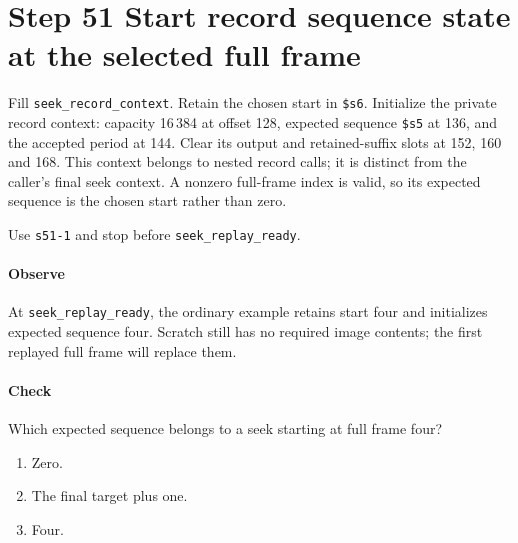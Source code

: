 \section{Step 51 Start record sequence state at the selected full frame}
Fill \texttt{seek\_record\_context}. Retain the chosen start in \texttt{\$s6}. Initialize the private record context: capacity 16\,384 at offset 128, expected sequence \texttt{\$s5} at 136, and the accepted period at 144. Clear its output and retained-suffix slots at 152, 160 and 168. This context belongs to nested record calls; it is distinct from the caller's final seek context. A nonzero full-frame index is valid, so its expected sequence is the chosen start rather than zero.

Use \texttt{s51-1} and stop before \texttt{seek\_replay\_ready}.

\paragraph{Observe} At \texttt{seek\_replay\_ready}, the ordinary example retains start four and initializes expected sequence four. Scratch still has no required image contents; the first replayed full frame will replace them.

\paragraph{Check} Which expected sequence belongs to a seek starting at full frame four?
\begin{enumerate}[label=\Alph*.]
  \item Zero.
  \item The final target plus one.
  \item Four.
\end{enumerate}
